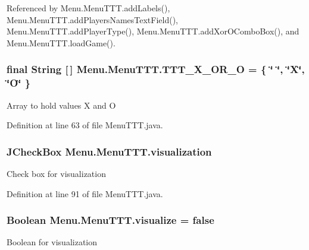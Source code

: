 Referenced by Menu.\+Menu\+T\+T\+T.\+add\+Labels(), Menu.\+Menu\+T\+T\+T.\+add\+Players\+Names\+Text\+Field(), Menu.\+Menu\+T\+T\+T.\+add\+Player\+Type(), Menu.\+Menu\+T\+T\+T.\+add\+Xor\+O\+Combo\+Box(), and Menu.\+Menu\+T\+T\+T.\+load\+Game().

\hypertarget{class_menu_1_1_menu_t_t_t_a05b9b5552eecd3dd9b969a21817f9789}{}
\subsubsection[{T\+T\+T\+\_\+\+X\+\_\+\+O\+R\+\_\+\+O}]{\setlength{\rightskip}{0pt plus 5cm}final String \mbox{[}$\,$\mbox{]} Menu.\+Menu\+T\+T\+T.\+T\+T\+T\+\_\+\+X\+\_\+\+O\+R\+\_\+\+O = \{ \char`\"{} \char`\"{}, \char`\"{}X\char`\"{}, \char`\"{}O\char`\"{} \}\hspace{0.3cm}{\ttfamily [private]}}\label{class_menu_1_1_menu_t_t_t_a05b9b5552eecd3dd9b969a21817f9789}
Array to hold values X and O 

Definition at line 63 of file Menu\+T\+T\+T.\+java.

\hypertarget{class_menu_1_1_menu_t_t_t_a611b82f2267f9ccb007b1ee5744e3088}{}
\subsubsection[{visualization}]{\setlength{\rightskip}{0pt plus 5cm}J\+Check\+Box Menu.\+Menu\+T\+T\+T.\+visualization\hspace{0.3cm}{\ttfamily [private]}}\label{class_menu_1_1_menu_t_t_t_a611b82f2267f9ccb007b1ee5744e3088}
Check box for visualization 

Definition at line 91 of file Menu\+T\+T\+T.\+java.

\hypertarget{class_menu_1_1_menu_t_t_t_a9d69fa1e5f80800c37ee3c47925f3f14}{}
\subsubsection[{visualize}]{\setlength{\rightskip}{0pt plus 5cm}Boolean Menu.\+Menu\+T\+T\+T.\+visualize = false\hspace{0.3cm}{\ttfamily [private]}}\label{class_menu_1_1_menu_t_t_t_a9d69fa1e5f80800c37ee3c47925f3f14}
Boolean for visualization 

